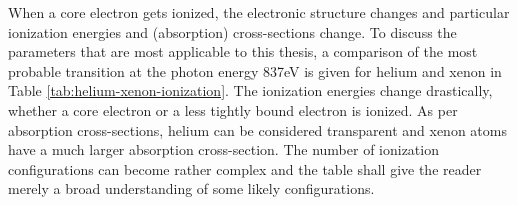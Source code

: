 When a core electron gets ionized, the electronic structure changes and particular ionization energies and (absorption) cross-sections change. To discuss the parameters that are most applicable to this thesis, a comparison of the most probable transition at the photon energy 837eV is given for helium and xenon in Table \ref{tab:helium-xenon-ionization}. The ionization energies change drastically, whether a core electron or a less tightly bound electron is ionized. As per absorption cross-sections, helium can be considered transparent and xenon atoms have a much larger absorption cross-section. The number of ionization configurations can become rather complex and the table shall give the reader merely a broad understanding of some likely configurations.\\[1\baselineskip]

